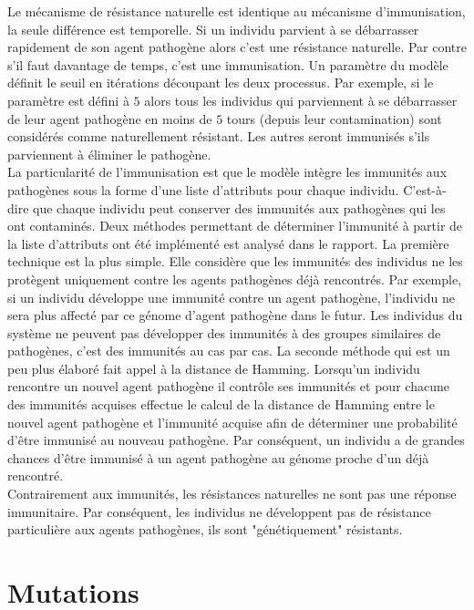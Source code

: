 Le mécanisme de résistance naturelle est identique au mécanisme d'immunisation, la seule différence est temporelle. Si un individu parvient à se débarrasser rapidement de son agent pathogène alors c'est une résistance naturelle. Par contre s'il faut davantage de temps, c'est une immunisation. Un paramètre du modèle définit le seuil en itérations découpant les deux processus. Par exemple, si le paramètre est défini à $5$ alors tous les individus qui parviennent à se débarrasser de leur agent pathogène en moins de $5$ tours (depuis leur contamination) sont considérés comme naturellement résistant. Les autres seront immunisés s'ils parviennent à éliminer le pathogène.\\

La particularité de l'immunisation est que le modèle intègre les immunités aux pathogènes sous la forme d'une liste d'attributs pour chaque individu. C'est-à-dire que chaque individu peut conserver des immunités aux pathogènes qui les ont contaminés. Deux méthodes permettant de déterminer l'immunité à partir de la liste d'attributs ont été implémenté est analysé dans le rapport. La première technique est la plus simple. Elle considère que les immunités des individus ne les protègent uniquement contre les agents pathogènes déjà rencontrés. Par exemple, si un individu développe une immunité contre un agent pathogène, l'individu ne sera plus affecté par ce génome d'agent pathogène dans le futur. Les individus du système ne peuvent pas développer des immunités à des groupes similaires de pathogènes, c'est des immunités au cas par cas. La seconde méthode qui est un peu plus élaboré fait appel à la distance de Hamming. Lorsqu'un individu rencontre un nouvel agent pathogène il contrôle ses immunités et pour chacune des immunités acquises effectue le calcul de la distance de Hamming entre le nouvel agent pathogène et l'immunité acquise afin de déterminer une probabilité d'être immunisé au nouveau pathogène. Par conséquent, un individu a de grandes chances d'être immunisé à un agent pathogène au génome proche d'un déjà rencontré.\\

Contrairement aux immunités, les résistances naturelles ne sont pas une réponse immunitaire. Par conséquent, les individus ne développent pas de résistance particulière aux agents pathogènes, ils sont "génétiquement" résistants. 

\section{Mutations}

